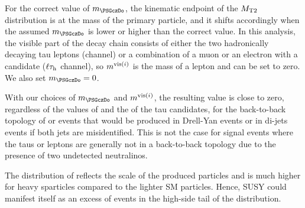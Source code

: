 For the correct value of $m_{\PSGczDo}$, the kinematic endpoint of the ${M_{\rm T2}}$ distribution is at the mass of the primary particle, and it shifts accordingly when the assumed $m_{\PSGczDo}$ is lower or higher than the correct value. In this analysis, 
the visible part of the decay chain consists of either the two hadronically decaying tau leptons (\tauTau channel)
or a combination of a muon or an electron with a \Tau candidate ($\ell\tau_{\rm h}$ channel), so $m^{{\rm vis}(i)}$ is the mass of a lepton and can be set to zero. We also set $m_{\PSGczDo}=0$. 

With  our choices of $m_{\PSGczDo}$ and $m^{{\rm vis}(i)}$, the resulting \mttwo value is close to zero, regardless of the values of \MPT and the \PT of 
the tau candidates, for the 
back-to-back topology of \tauTau or \leptonTau  
events that would be produced in Drell-Yan events or in di-jets events if both jets are misidentified. This is not the case for signal events where the taus or leptons are generally not in a back-to-back topology due 
to the presence of two undetected neutralinos.

The distribution of \mttwo reflects the scale of the produced particles and is much higher for heavy sparticles
compared to the lighter SM particles. Hence, SUSY 
could manifest itself
as an excess of events in the high-side tail of the \mttwo distribution.
